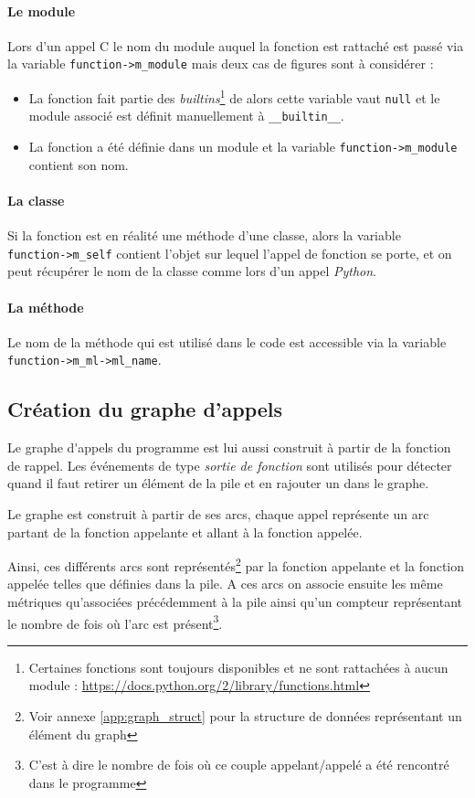 \paragraph*{Le module} Lors d'un appel C le nom du module auquel la fonction est rattaché est passé via la variable \verb|function->m_module| mais deux cas de figures sont à considérer : 
\begin{itemize}
\item La fonction fait partie des \emph{builtins}\footnote{Certaines fonctions sont toujours disponibles et ne sont rattachées à aucun module : \url{https://docs.python.org/2/library/functions.html}} de \Python alors cette variable vaut \verb|null| et le module associé est définit manuellement à \verb|__builtin__|.
\item La fonction a été définie dans un module et la variable \verb|function->m_module| contient son nom.
\end{itemize}

\paragraph*{La classe} Si la fonction est en réalité une méthode d'une classe, alors la variable\\ \verb|function->m_self| contient l'objet sur lequel l'appel de fonction se porte, et on peut récupérer le nom de la classe comme lors d'un appel \emph{Python}.

\paragraph*{La méthode} Le nom de la méthode qui est utilisé dans le code \Python est accessible via la variable \verb|function->m_ml->ml_name|.
  
\subsection{Création du graphe d'appels}
\label{subsec:crea-graph-appel}
Le \gls{graphe d'appels} du programme est lui aussi construit à partir de la fonction de rappel. Les événements de type \emph{sortie de fonction} sont utilisés pour détecter quand il faut retirer un élément de la pile et en rajouter un dans le graphe.

Le graphe est construit à partir de ses arcs, chaque appel représente un arc partant de la fonction appelante et allant à la fonction appelée.

Ainsi, ces différents arcs sont représentés\footnote{Voir annexe \vref{app:graph_struct} pour la structure de données représentant un élément du graph} par la fonction appelante et la fonction appelée telles que définies dans la pile. A ces arcs on associe ensuite les même métriques qu'associées précédemment à la pile ainsi qu'un compteur représentant le nombre de fois où l'arc est présent\footnote{C'est à dire le nombre de fois où ce couple appelant/appelé a été rencontré dans le programme}.

